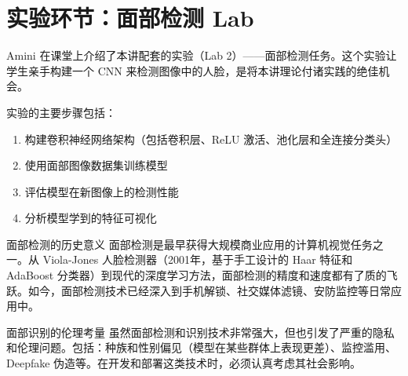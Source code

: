 \section{实验环节：面部检测 Lab}

Amini 在课堂上介绍了本讲配套的实验（Lab 2）——面部检测任务。这个实验让学生亲手构建一个 CNN 来检测图像中的人脸，是将本讲理论付诸实践的绝佳机会。

实验的主要步骤包括：
\begin{enumerate}
    \item 构建卷积神经网络架构（包括卷积层、ReLU 激活、池化层和全连接分类头）
    \item 使用面部图像数据集训练模型
    \item 评估模型在新图像上的检测性能
    \item 分析模型学到的特征可视化
\end{enumerate}

\begin{knowledgebox}{面部检测的历史意义}
面部检测是最早获得大规模商业应用的计算机视觉任务之一。从 Viola-Jones 人脸检测器（2001年，基于手工设计的 Haar 特征和 AdaBoost 分类器）到现代的深度学习方法，面部检测的精度和速度都有了质的飞跃。如今，面部检测技术已经深入到手机解锁、社交媒体滤镜、安防监控等日常应用中。
\end{knowledgebox}

\begin{warningbox}{面部识别的伦理考量}
虽然面部检测和识别技术非常强大，但也引发了严重的隐私和伦理问题。包括：种族和性别偏见（模型在某些群体上表现更差）、监控滥用、Deepfake 伪造等。在开发和部署这类技术时，必须认真考虑其社会影响。
\end{warningbox}

\newpage
